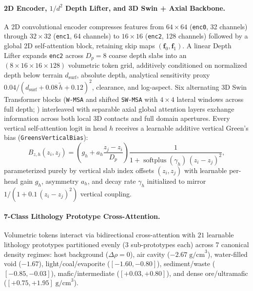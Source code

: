 \documentclass[11pt,a4paper]{article}
\begin{document}
\paragraph{2D Encoder, $1/d^2$ Depth Lifter, and 3D Swin + Axial Backbone.}
A 2D convolutional encoder compresses features from $64 \times 64$ (\texttt{enc0}, 32 channels) through $32\times 32$ (\texttt{enc1}, 64 channels) to $16 \times 16$ (\texttt{enc2}, 128 channels) followed by a global 2D self-attention block, retaining skip maps $(\mathbf{f}_0, \mathbf{f}_1)$. A linear Depth Lifter expands \texttt{enc2} across $D_p = 8$ coarse depth slabs into an $(8 \times 16 \times 16 \times 128)$ volumetric token grid, additively conditioned on normalized depth below terrain $d_{\mathrm{surf}}$, absolute depth, analytical sensitivity proxy $0.04 / (d_{\mathrm{surf}} + 0.08\,\tilde{h} + 0.12)^2$, clearance, and log-aspect. Six alternating 3D Swin Transformer blocks (\texttt{W-MSA} and shifted \texttt{SW-MSA} with $4\times 4$ lateral windows across full depth; \citealp{liu2021swin}) interleaved with separable axial global attention layers exchange information across both local 3D contacts and full domain apertures. Every vertical self-attention logit in head $h$ receives a learnable additive vertical Green's bias (\texttt{GreensVerticalBias}):
\begin{equation}
  B_{z,h}(z_i, z_j) = \left(g_h + a_h \frac{z_j - z_i}{D_p}\right) \frac{1}{1 + \operatorname{softplus}(\gamma_h)\,(z_i - z_j)^2},
  \label{eq:gvb}
\end{equation}
parameterized purely by vertical slab index offsets $(z_i, z_j)$ with learnable per-head gain $g_h$, asymmetry $a_h$, and decay rate $\gamma_h$ initialized to mirror $1/(1 + 0.1\,(z_i - z_j)^2)$ vertical coupling.

\paragraph{7-Class Lithology Prototype Cross-Attention.}
Volumetric tokens interact via bidirectional cross-attention with $21$ learnable lithology prototypes partitioned evenly ($3$ sub-prototypes each) across 7 canonical density regimes: host background ($\Delta\rho = 0$), air cavity ($-2.67\;\text{g/cm}^3$), water-filled void ($-1.67$), light/coal/\allowbreak evaporite ($[-1.60, -0.80]$), sediment/\allowbreak waste ($[-0.85, -0.03]$), mafic/\allowbreak intermediate ($[+0.03, +0.80]$), and dense ore/\allowbreak ultramafic ($[+0.75, +1.95]\;\text{g/cm}^3$).
\end{document}
